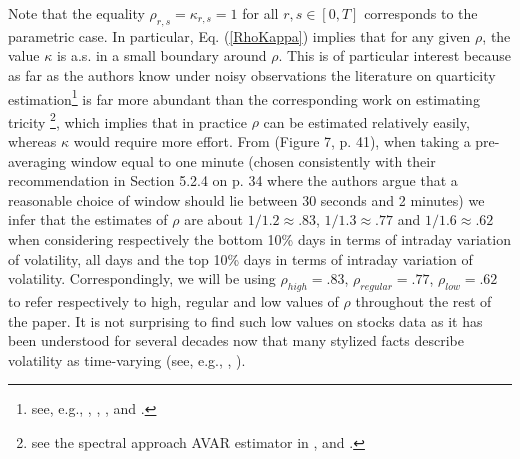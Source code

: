 \documentclass[11pt]{article}
\numberwithin{equation}{section}
\theoremstyle{plain}
\theoremstyle{remark}
\begin{document}
Note that the equality $\rho_{r,s} = \kappa_{r,s} = 1$ for all $r,s \in [0,T]$ corresponds to the parametric case. In particular, Eq. (\ref{RhoKappa}) implies that for any given $\rho$, the value $\kappa$ is a.s. in a small boundary around $\rho$. This is of particular interest because as far as the authors know under noisy observations the literature on quarticity estimation\footnote{see, e.g., \cite{jacod2009microstructure}, \cite{andersen2014robust}, \cite{mancino2012estimation}, \cite{potiron2016local} and \cite{clinet2017estimation}.}  is far more abundant than the corresponding work on estimating tricity \footnote{see the spectral approach AVAR estimator in \cite{altmeyer2015functional}, \cite{potiron2016local} and \cite{clinet2017estimation}.}, which implies that in practice $\rho$ can be estimated relatively easily, whereas $\kappa$ would require more effort. From \cite{andersen2014robust} (Figure 7, p. 41), when taking a pre-averaging window equal to one minute (chosen consistently with their recommendation in Section 5.2.4 on p. 34 where the authors argue that a reasonable choice of window should lie between 30 seconds and 2 minutes) we infer that the estimates of $\rho$ are about $1/1.2 \approx .83$, $1/1.3 \approx .77$ and $1/1.6 \approx .62$ when considering respectively the bottom 10\% days in terms of intraday variation of volatility, all days and the top 10\% days in terms of intraday variation of volatility. Correspondingly, we will be using $\rho_{high} = .83$, $\rho_{regular} = .77$, $\rho_{low} = .62$ to refer respectively to high, regular and low values of $\rho$ throughout the rest of the paper. It is not surprising to find such low values on stocks data as it has been understood for several decades now that many stylized facts describe volatility as time-varying (see, e.g., \cite{ghysels19965}, \cite{engle2001good}).
\end{document}
